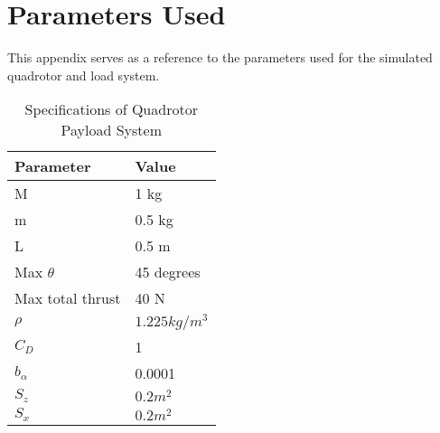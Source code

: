 \chapter{Parameters Used}
This appendix serves as a reference to the parameters used for the simulated quadrotor and load system. 

\begin{table}[ht]
\centering
\caption{Specifications of Quadrotor Payload System}
\begin{tabular}{|l|l|}
\hline
\textbf{Parameter} & \textbf{Value} \\ \hline
M                  & 1 kg           \\ \hline
m                  & 0.5 kg         \\ \hline
L                  & 0.5 m          \\ \hline
Max $\theta$       & 45 degrees     \\ \hline
Max total thrust   & 40 N           \\ \hline
$\rho$             & $1.225 kg/m^{3}$\\ \hline
$C_{D}$            & 1 \\ \hline
$b_{\alpha}$        & 0.0001 \\ \hline
$S_{z}$                 & $0.2 m^{2}$ \\ \hline
$S_{x}$                 & $0.2 m^{2}$ \\ \hline
\end{tabular}
\end{table}